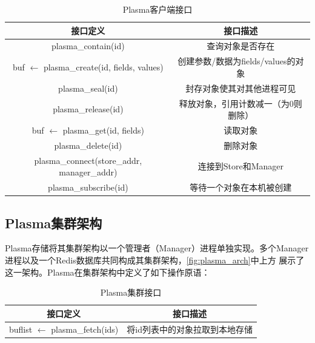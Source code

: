\begin{table}[h]
    \centering
    \caption{Plasma客户端接口}
    \begin{tabular}{*{2}{c}}
        \toprule
        接口定义 & 接口描述      \\
        \midrule
        plasma\_contain(id)                                    & 查询对象是否存在   \\
        buf $\leftarrow$ plasma\_create(id, fields, values)    & 创建参数/数据为fields/values的对象   \\
        plasma\_seal(id)                                       & 封存对象使其对其他进程可见   \\
        plasma\_release(id)                                    & 释放对象，引用计数减一（为0则删除）   \\
        buf $\leftarrow$ plasma\_get(id, fields)               & 读取对象   \\
        plasma\_delete(id)                                     & 删除对象   \\
        \midrule
        plasma\_connect(store\_addr, manager\_addr)            & 连接到Store和Manager \\
        plasma\_subscribe(id)                                  & 等待一个对象在本机被创建 \\ 
        \bottomrule
    \end{tabular}
    \label{tab:store_api}
\end{table}

\subsection{Plasma集群架构}

Plasma存储将其集群架构以一个管理者（Manager）进程单独实现。多个Manager进程以及一个Redis数据库共同构成其集群架构，\autoref{fig:plasma_arch}中上方
展示了这一架构。Plasma在集群架构中定义了如下操作原语：

\begin{table}[h]
    \centering
    \caption{Plasma集群接口}
    \begin{tabular}{*{2}{c}}
        \toprule
        接口定义 & 接口描述      \\
        \midrule
        buflist $\leftarrow$ plasma\_fetch(ids)               & 将id列表中的对象拉取到本地存储   \\
        \bottomrule
    \end{tabular}
    \label{tab:manager_api}
\end{table}


